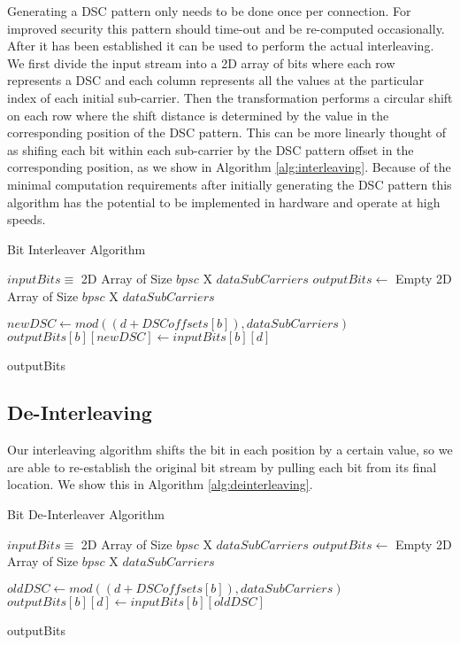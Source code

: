 \documentclass[sigconf]{acmart}
\begin{document}
Generating a DSC pattern only needs to be done once per connection. For improved security this pattern should time-out and be re-computed occasionally. After it has been established it can be used to perform the actual interleaving. We first divide the input stream into a 2D array of bits where each row represents a DSC and each column represents all the values at the particular index of each initial sub-carrier. Then the transformation performs a circular shift on each row where the shift distance is determined by the value in the corresponding position of the DSC pattern. This can be more linearly thought of as shifing each bit within each sub-carrier by the DSC pattern offset in the corresponding position, as we show in Algorithm \ref{alg:interleaving}. Because of the minimal computation requirements after initially generating the DSC pattern this algorithm has the potential to be implemented in hardware and operate at high speeds.

\begin{algorithm}[H]
\caption{Bit Interleaver Algorithm}
\label{alg:interleaving}
\begin{algorithmic}

\REQUIRE $inputBits \equiv$ 2D Array of Size $bpsc$ X $dataSubCarriers$
\STATE $outputBits \leftarrow $ Empty 2D Array of Size $bpsc$ X $dataSubCarriers$
\STATE

        \STATE $newDSC \leftarrow mod((d + DSCoffsets[b]), dataSubCarriers)$
        \STATE $outputBits[b][newDSC] \leftarrow inputBits[b][d]$
    \ENDFOR
\ENDFOR
\STATE

\RETURN outputBits 
\end{algorithmic}
\end{algorithm}

\subsection{De-Interleaving}
\label{sub:deinterleaving}

Our interleaving algorithm shifts the bit in each position by a certain value, so we are able to re-establish the original bit stream by pulling each bit from its final location. We show this in Algorithm \ref{alg:deinterleaving}.

\begin{algorithm}[H]
\caption{Bit De-Interleaver Algorithm}
\label{alg:deinterleaving}
\begin{algorithmic}

\REQUIRE $inputBits \equiv$ 2D Array of Size $bpsc$ X $dataSubCarriers$
\STATE $outputBits \leftarrow $ Empty 2D Array of Size $bpsc$ X $dataSubCarriers$
\STATE

        \STATE $oldDSC \leftarrow mod((d + DSCoffsets[b]), dataSubCarriers)$
        \STATE $outputBits[b][d] \leftarrow inputBits[b][oldDSC]$
    \ENDFOR
\ENDFOR
\STATE

\RETURN outputBits 
\end{algorithmic}
\end{algorithm}
\end{document}
